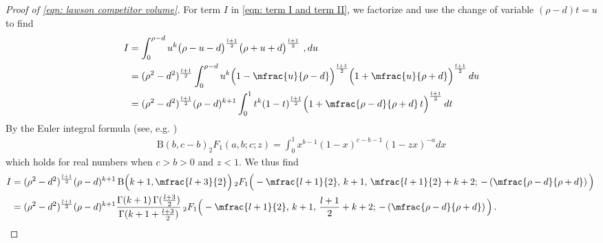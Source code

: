 \documentclass[10pt,reqno]{amsart}
\numberwithin{equation}{section}
\theoremstyle{definition}
\begin{document}
{{\begin{proof}[Proof of \eqref{eqn: lawson competitor volume}]
For term $I$ in \eqref{eqn: term I and term II}, we factorize and use the change of variable $(\rho-d)t = u$ to find
\begin{align*}
    I & = \int_0^{\rho-d} u^k \big(\rho - u-d\big)^{\frac{l+1}{2}} \big(\rho + u + d\big)^{\frac{l+1}{2}} \ ,du  \\
    & = {(\rho^2 - d^2)^{\frac{l+1}{2}}} \int_0^{\rho-d} u^k \Big(1 - \mfrac{u}{\rho-d} \Big)^{\frac{l+1}{2}} \Big(1 + \mfrac{u}{\rho+d} \Big)^{\frac{l+1}{2}} \, du\\
     & = {(\rho^2 - d^2)^{\frac{l+1}{2}}} (\rho -d)^{k+1}\int_0^1 t^k (1-t)^{\frac{l+1}{2}} \Big( 1 + \mfrac{\rho - d}{\rho+ d} \, t \Big)^{\frac{l+1}{2}}\, dt
\end{align*}
By the Euler integral formula (see, e.g. \cite[\S 2.1.3]{bateman_2023_cnd32-h9x80})
\begin{align}\label{eqn:euler type identity}
\mathrm{B}(b, c-b)_2 F_1(a, b ; c ; z)=\int_0^1 x^{b-1}(1-x)^{c-b-1}(1-z x)^{-a} d x
\end{align}
which holds for real numbers when $c>b>0$ and $z < 1$. We thus find
 \begin{align*}
  I   & ={(\rho^2 - d^2)^{\frac{l+1}{2}}} (\rho -d)^{k+1} \, \mathrm{B}\Big(k+1 , \mfrac{l+3}{2}\Big)\,  {}_2F_1\Big(-\mfrac{l+1}{2},\, k+1, \, \mfrac{l+1}{2} + k +2 ;\,  - \left(\mfrac{\rho - d}{\rho +d}\right) \Big)\,\\
     & = {(\rho^2 - d^2)^{\frac{l+1}{2}}} (\rho -d)^{k+1} \frac{\Gamma(k+1)\, \Gamma(\frac{l+3}{2})}{\Gamma(k+1 + \frac{l+3}{2})}\,  {}_2F_1\Big(-\mfrac{l+1}{2},\, k+1, \, \frac{l+1}{2} + k +2 ; \, -\left( \mfrac{\rho - d}{\rho +d} \right) \Big)\,.
\end{align*}





\end{proof}}}
\end{document}
